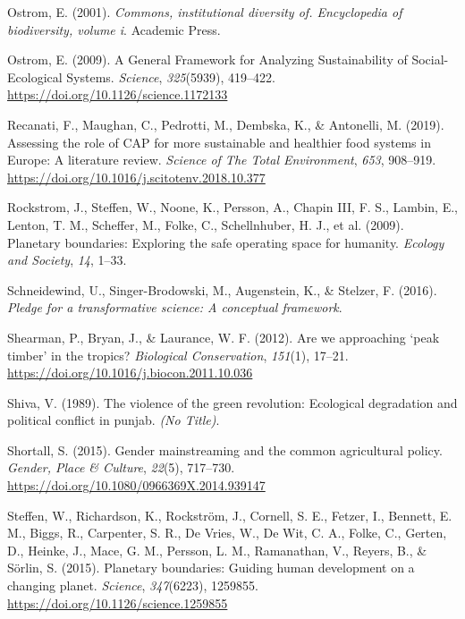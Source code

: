 \documentclass[a4paper, nobind]{templates/ociamthesis}
\newlength{\cslhangindent}
\newenvironment{CSLReferences}[2] %
 {%
  \setlength{\parindent}{0pt}
  \ifodd #1
  \let\oldpar\par
  \def\par{\hangindent=\cslhangindent\oldpar}
  \fi
  \setlength{\parskip}{1mm}
  \setlength{\baselineskip}{6mm}
 }%
 {}
\begin{document}
\begin{CSLReferences}{1}{0}
\leavevmode{}%
Ostrom, E. (2001). \emph{Commons, institutional diversity of. Encyclopedia of biodiversity, volume i}. Academic Press.

\leavevmode{}%
Ostrom, E. (2009). A General Framework for Analyzing Sustainability of Social-Ecological Systems. \emph{Science}, \emph{325}(5939), 419--422. \url{https://doi.org/10.1126/science.1172133}

\leavevmode{}%
Recanati, F., Maughan, C., Pedrotti, M., Dembska, K., \& Antonelli, M. (2019). Assessing the role of CAP for more sustainable and healthier food systems in Europe: A literature review. \emph{Science of The Total Environment}, \emph{653}, 908--919. \url{https://doi.org/10.1016/j.scitotenv.2018.10.377}

\leavevmode{}%
Rockstrom, J., Steffen, W., Noone, K., Persson, A., Chapin III, F. S., Lambin, E., Lenton, T. M., Scheffer, M., Folke, C., Schellnhuber, H. J., et al. (2009). Planetary boundaries: Exploring the safe operating space for humanity. \emph{Ecology and Society}, \emph{14}, 1--33.

\leavevmode{}%
Schneidewind, U., Singer-Brodowski, M., Augenstein, K., \& Stelzer, F. (2016). \emph{Pledge for a transformative science: A conceptual framework}.

\leavevmode{}%
Shearman, P., Bryan, J., \& Laurance, W. F. (2012). Are we approaching {`}peak timber{'} in the tropics? \emph{Biological Conservation}, \emph{151}(1), 17--21. \url{https://doi.org/10.1016/j.biocon.2011.10.036}

\leavevmode{}%
Shiva, V. (1989). The violence of the green revolution: Ecological degradation and political conflict in punjab. \emph{(No Title)}.

\leavevmode{}%
Shortall, S. (2015). Gender mainstreaming and the common agricultural policy. \emph{Gender, Place \& Culture}, \emph{22}(5), 717--730. \url{https://doi.org/10.1080/0966369X.2014.939147}

\leavevmode{}%
Steffen, W., Richardson, K., Rockström, J., Cornell, S. E., Fetzer, I., Bennett, E. M., Biggs, R., Carpenter, S. R., De Vries, W., De Wit, C. A., Folke, C., Gerten, D., Heinke, J., Mace, G. M., Persson, L. M., Ramanathan, V., Reyers, B., \& Sörlin, S. (2015). Planetary boundaries: Guiding human development on a changing planet. \emph{Science}, \emph{347}(6223), 1259855. \url{https://doi.org/10.1126/science.1259855}


\end{CSLReferences}
\end{document}

